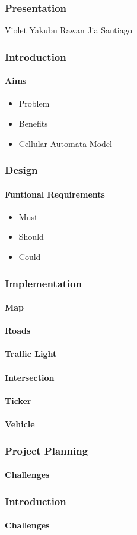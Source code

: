 \documentclass[mathserif,serif]{beamer}
\begin{document}
  \begin{frame}
    \frametitle{Presentation}
    Violet
    Yakubu
    Rawan
    Jia
    Santiago
  \end{frame}
  \begin{frame}
    \frametitle{Introduction}
    \framesubtitle{Aims}
    \begin{itemize}
    \item Problem
    \item Benefits
    \item Cellular Automata Model
    \end{itemize}

  \end{frame}
  
  \begin{frame}
    \frametitle{Design}
    \framesubtitle{Funtional Requirements}
  
   \begin{itemize}
    \item Must
    \item Should
    \item Could
    \end{itemize}

  
  
  \end{frame}
  
  \begin{frame}
    \frametitle{Implementation}
    \framesubtitle{Map}
    \framesubtitle{Roads}
    \framesubtitle{Traffic Light}
        \framesubtitle{Intersection}
          \framesubtitle{Ticker}
          \framesubtitle{Vehicle}
    
  \end{frame}
  
  \begin{frame}
    \frametitle{Project Planning}
    \framesubtitle{Challenges}
  \end{frame}
  
  \begin{frame}
    \frametitle{Introduction}
    \framesubtitle{Challenges}
  \end{frame}
  
  
  
\end{document}
